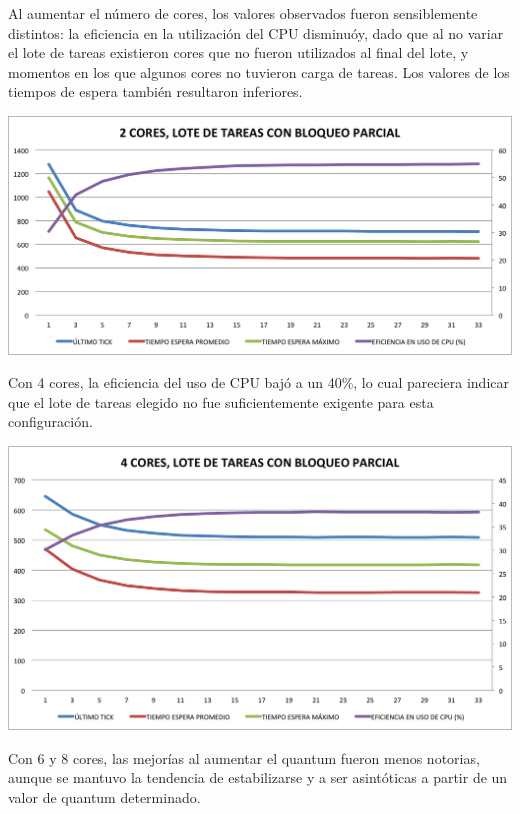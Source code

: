 Al aumentar el n\'umero de cores, los valores observados fueron sensiblemente distintos: la eficiencia en la utilizaci\'on del CPU disminu\'oy, dado que al no variar el lote de tareas existieron cores que no fueron utilizados al final del lote, y momentos en los que algunos cores no tuvieron carga de tareas. Los valores de los tiempos de espera tambi\'en resultaron inferiores.

\begin{center}
	\includegraphics[scale=0.4]{graficos/2cores_loteNormal.png}
\end{center}

Con 4 cores, la eficiencia del uso de CPU baj\'o a un 40\%, lo cual pareciera indicar que el lote de tareas elegido no fue suficientemente exigente para esta configuraci\'on. 

\begin{center}
	\includegraphics[scale=0.4]{graficos/4cores_loteNormal.png}
\end{center}

Con 6 y 8 cores, las mejor\'ias al aumentar el quantum fueron menos notorias, aunque se mantuvo la tendencia de estabilizarse y a ser asint\'oticas a partir de un valor de quantum determinado.

